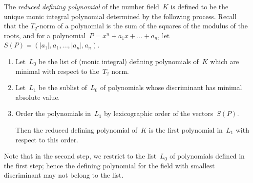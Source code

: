 \documentclass{article}
\def\Z{{\mathbb Z}}
\begin{document}
The \emph{reduced defining polynomial} of the number field~$K$ is
defined to be the unique monic integral polynomial determined by the
following process. Recall that the $T_2$-norm of a polynomial is the
sum of the squares of the modulus of the roots, and for a
polynomial~$P = x^n + a_1x + \dots + a_n$, let~$S(P) =
(|a_1|,a_1,\dots,|a_n|,a_n)$.
\begin{enumerate}
  \item Let~$L_0$ be the list of (monic integral) defining polynomials
    of~$K$ which are minimal with respect to the~$T_2$ norm.
  \item Let~$L_1$ be the sublist of~$L_0$ of polynomials whose
    discriminant has minimal absolute value.
  \item Order the polynomials in~$L_1$ by lexicographic order of the
    vectors~$S(P)$.

    Then the reduced defining polynomial of~$K$ is the first
    polynomial in~$L_1$ with respect to this order.
\end{enumerate}

\begin{comment} %
\begin{enumerate}
  \item Let~$L_0$ be the list of characteristic polynomials in $\Z[x]$
    of integral primitive elements of~$K$, minimal with respect to
    the~$T_2$ norm (the sum of the squares of the modulus of the
    roots).
  \item Let~$L_1$ be the sublist of~$L_0$ of polynomials whose discriminant has
    minimal absolute value.
  \item Let~$L_2$ be the sublist of~$L_1$ defined as follows. In each
    pair~$\{P(x), (-1)^{\deg P}P(-x)\}$ of monic polynomials, choose the unique
    polynomial~$Q$ such that when written~$Q(x) = Q_1(x^2)+xQ_2(x^2)$, at most
    one of~$Q_1,Q_2$ has positive leading coefficient.
  \item Order the integers by absolute value first, breaking ties by
    putting~$-|x|$ before~$|x|$. Order the polynomials in~$L_2$ by the
    lexicographic order of the coefficient vectors (from the leading coefficient
    to the constant coefficient) where integers are ordered as above. Then the
    {\tt polredabs} polynomial of~$K$ is the smallest polynomial in~$L_2$ for
    that order.
\end{enumerate}
\end{comment}

Note that in the second step, we restrict to the list~$L_0$ of
polynomials defined in the first step; hence the defining polynomial
for the field with smallest discriminant may not belong to the list.
\end{document}
